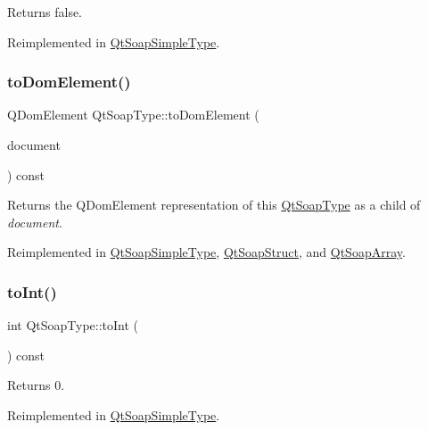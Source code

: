 Returns false. 

Reimplemented in \mbox{\hyperlink{class_qt_soap_simple_type_ae66188ecb3501673471e4fa1a754ef33}{Qt\+Soap\+Simple\+Type}}.

\mbox{\label{class_qt_soap_type_a77b7274ffbc9374187a2cc8cca27cdb6}} 
\subsubsection{\texorpdfstring{to\+Dom\+Element()}{toDomElement()}}
{\footnotesize\ttfamily Q\+Dom\+Element Qt\+Soap\+Type\+::to\+Dom\+Element (\begin{DoxyParamCaption}\item[{Q\+Dom\+Document}]{document }\end{DoxyParamCaption}) const\hspace{0.3cm}{\ttfamily [virtual]}}

Returns the Q\+Dom\+Element representation of this \mbox{\hyperlink{class_qt_soap_type}{Qt\+Soap\+Type}} as a child of {\itshape document}. 

Reimplemented in \mbox{\hyperlink{class_qt_soap_simple_type_a85fb947fe3abe23c48a08a0d4f82604e}{Qt\+Soap\+Simple\+Type}}, \mbox{\hyperlink{class_qt_soap_struct_a3a57e002d42e8d048b0c0bf9678ff2f9}{Qt\+Soap\+Struct}}, and \mbox{\hyperlink{class_qt_soap_array_afd48e465aad1088003c1cc7024b99e81}{Qt\+Soap\+Array}}.

\mbox{\label{class_qt_soap_type_a5a94747abe5773d9bc83aff7f7efe9ee}} 
\subsubsection{\texorpdfstring{to\+Int()}{toInt()}}
{\footnotesize\ttfamily int Qt\+Soap\+Type\+::to\+Int (\begin{DoxyParamCaption}{ }\end{DoxyParamCaption}) const\hspace{0.3cm}{\ttfamily [virtual]}}

Returns 0. 

Reimplemented in \mbox{\hyperlink{class_qt_soap_simple_type_a3308ce664e671f234e2f3a508d858b48}{Qt\+Soap\+Simple\+Type}}.

